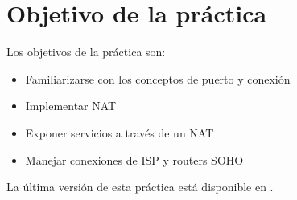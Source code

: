 
\usepackage{eurosym}


\renewcommand{\hmwkClass}{Planificación y Administración de Redes}
\renewcommand{\hmwkTitle}{Práctica de conexiones TCP}









\primerapagina

\setlength{\parindent}{0em}
\setlength{\parskip}{1em}


\section{Objetivo de la práctica}
Los objetivos  de la práctica son:
\begin{itemize}
\item Familiarizarse con los conceptos de puerto y conexión
\item Implementar NAT
\item Exponer servicios a través de un NAT  
\item Manejar conexiones de ISP y routers SOHO
\end{itemize}


La última versión de esta práctica está disponible en .


